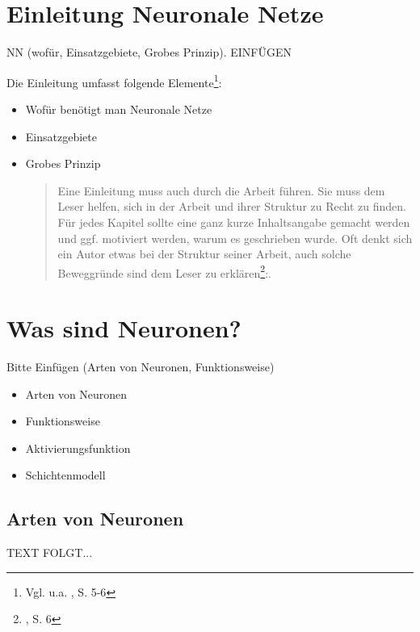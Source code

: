 \documentclass[a4paper,12pt,oneside]{article}
\begin{document}
  \section{Einleitung Neuronale Netze}\label{kap_NeuronaleNetze}  
   NN (wofür, Einsatzgebiete, Grobes Prinzip). EINFÜGEN
   
    \vspace{1cm}
 \begin{tcolorbox}[title={Inhalt}]
Die Einleitung umfasst folgende Elemente\footnote{Vgl. u.a. \cite{BBoJ}, S. 5-6}:
\begin{itemize}
 \item Wofür benötigt man Neuronale Netze
 \item Einsatzgebiete
 \item  Grobes Prinzip
\begin{quotation}
Eine Einleitung muss auch durch die Arbeit führen. Sie muss dem Leser helfen, sich in der Arbeit und ihrer Struktur zu Recht zu finden. Für jedes Kapitel sollte eine ganz kurze Inhaltsangabe gemacht werden und ggf. motiviert werden, warum es geschrieben wurde. Oft denkt sich ein Autor etwas bei der Struktur seiner Arbeit, auch solche Beweggründe sind dem Leser zu erklären\footnote{\cite{BBoJ}, S. 6}:. 
\end{quotation}
\end{itemize}
  \end{tcolorbox}
   
  \newpage  
  \section{Was sind Neuronen?}\label{kap_Neuronen}  
    Bitte Einfügen (Arten von Neuronen, Funktionsweise)
    \begin{tcolorbox}[title={Inhalt}]
    \begin{itemize} 
      \item Arten von Neuronen
      \item Funktionsweise
      \item Aktivierungsfunktion
      \item Schichtenmodell
    \end{itemize} 
    \end{tcolorbox}
   
    \subsection{Arten von Neuronen}\label{arten_von_neuronen}
     TEXT FOLGT... 
     
\end{document}
